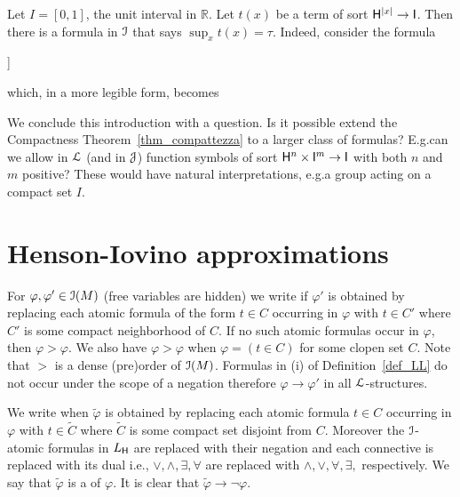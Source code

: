 \documentclass[10pt,oneside]{amsproc}
\renewcommand*{\emph}[1]{%
   \smash{\tikz[baseline]\node[rectangle, fill=teal!25, rounded corners, inner xsep=0.5ex, inner ysep=0.2ex, anchor=base, minimum height = 2.7ex]{\strut #1};}}
\begin{document}
\begin{example}\label{ex_Rvlogic}
  Let $I=[0,1]$, the unit interval in $\mathds{R}$.
  Let $t(x)$ be a term of sort ${\sf H}^{|x|}\to {\sf I}$.
  Then there is a formula in ${\EuScript I}$ that says $\sup_{x} t(x)=\tau$.
  Indeed, consider the formula

  {\wedge}{\forallI \varepsilon \Big[\varepsilon\in\{0\}\ \vee\ \existsH x\ \big[\tau\dotminus (t(x)+\varepsilon)\in\{0\}\big]\Big]}

  which, in a more legible form, becomes

\end{example}

We conclude this introduction with a question.
Is it possible extend the Compactness Theorem~\ref{thm_compattezza} to a larger class of formulas?
E.g.\@ can we allow in ${\EuScript L}$ (and in ${\EuScript J}$) function symbols of sort ${\sf H}^n\times {\sf I}^m\to {\sf I}$ with both $n$ and $m$ positive?
These would have natural interpretations, e.g.\@ a group acting on a compact set $I$.

\section{Henson-Iovino approximations}\label{ultrapws}


For $\varphi,\varphi'\in{\EuScript I}(M)$ (free variables are hidden) we write \emph{$\varphi'>\varphi$\/} if $\varphi'$ is obtained by replacing each atomic formula of the form $t\in C$ occurring in $\varphi$ with $t\in C'$ where $C'$ is some compact neighborhood of $C$.
If no such atomic formulas occur in $\varphi$, then $\varphi>\varphi$.
We also have $\varphi>\varphi$ when $\varphi=(t\in C)$ for some clopen set $C$.
Note that $>$ is a dense (pre)order of ${\EuScript I}(M)$.
Formulas in (i) of Definition~\ref{def_LL} do not occur under the scope of a negation therefore $\varphi\to\varphi'$ in all ${\EuScript L}$-structures.

We write \emph{$\tilde{\varphi}\perp\varphi$\/} when $\tilde{\varphi}$ is obtained by replacing each atomic formula $t\in C$ occurring in $\varphi$ with $t\in\tilde{C}$ where $\tilde{C}$ is some compact set disjoint from $C$.
Moreover the ${\EuScript I}$-atomic formulas in $L_{\sf H}$ are replaced with their negation and each connective is replaced with its dual i.e., $\vee, \wedge, \exists,\forall$ are replaced with $\wedge,\vee,\forall,\exists,$ respectively.
We say that  $\tilde{\varphi}$ is a \emph{strong negation} of $\varphi$.
It is clear that $\tilde{\varphi}\rightarrow\neg\varphi$.
\end{document}
